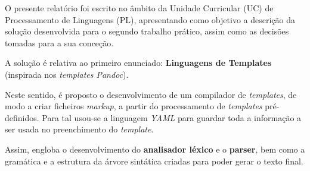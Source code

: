 \documentclass[../relatorio.tex]{subfiles}
\begin{document}
O presente relatório foi escrito no âmbito da Unidade Curricular (UC) de Processamento de Linguagens (PL), apresentando 
como objetivo a descrição da solução desenvolvida para o segundo trabalho prático, assim como as decisões 
tomadas para a sua conceção.

A solução é relativa ao primeiro enunciado: \textbf{Linguagens de Templates} 
(inspirada nos \textit{templates Pandoc}).

Neste sentido, é proposto o desenvolvimento de um compilador de \textit{templates},
de modo a criar ficheiros \textit{markup}, a partir do processamento de
\textit{templates} pré-definidos. 
Para tal usou-se a linguagem \textit{YAML} para guardar toda a 
informação a ser usada no preenchimento do \textit{template}.

Assim, engloba o desenvolvimento do \textbf{analisador léxico} e o \textbf{parser}, 
bem como a gramática e a estrutura da árvore sintática criadas  
para poder gerar o texto final. 
\end{document}
